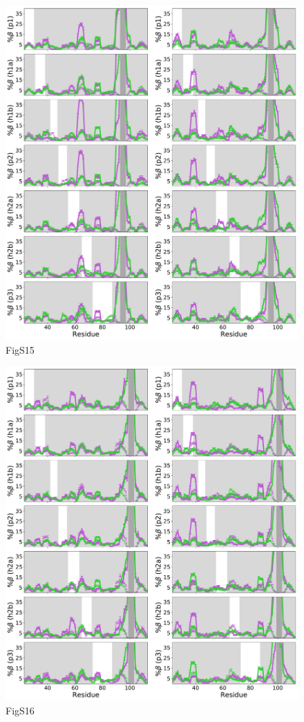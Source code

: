 \documentclass[10pt,letterpaper]{article}
\begin{document}
\begin{figure}[!ht]
\includegraphics[scale=0.5,width=\textwidth,trim={0 0cm 0 0cm},clip]{./figures/S15.pdf}
\caption{{FigS15}}
\end{figure}

\begin{figure}[!ht]
\includegraphics[scale=0.5,width=\textwidth,trim={0 0cm 0 0cm},clip]{./figures/S16.pdf}
\caption{{FigS16}}
\end{figure}
\end{document}
